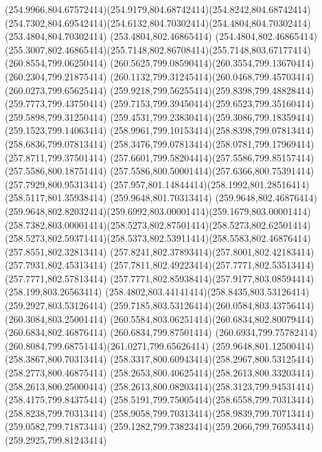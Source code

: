 {{	\curveto(254.9966,804.67572414)(254.9179,804.68742414)(254.8242,804.68742414)
	\curveto(254.7302,804.69542414)(254.6132,804.70302414)(254.4804,804.70302414)
	\lineto(253.4804,804.70302414)
	\lineto(253.4804,802.46865414)
	\lineto(254.4804,802.46865414)
	\curveto(255.3007,802.46865414)(255.7148,802.86708414)(255.7148,803.67177414)
	\closepath
	\moveto(260.8554,799.06250414)
	\curveto(260.5625,799.08590414)(260.3554,799.13670414)(260.2304,799.21875414)
	\curveto(260.1132,799.31245414)(260.0468,799.45703414)(260.0273,799.65625414)
	\curveto(259.9218,799.56255414)(259.8398,799.48828414)(259.7773,799.43750414)
	\curveto(259.7153,799.39450414)(259.6523,799.35160414)(259.5898,799.31250414)
	\curveto(259.4531,799.23830414)(259.3086,799.18359414)(259.1523,799.14063414)
	\curveto(258.9961,799.10153414)(258.8398,799.07813414)(258.6836,799.07813414)
	\curveto(258.3476,799.07813414)(258.0781,799.17969414)(257.8711,799.37501414)
	\curveto(257.6601,799.58204414)(257.5586,799.85157414)(257.5586,800.18751414)
	\curveto(257.5586,800.50001414)(257.6366,800.75391414)(257.7929,800.95313414)
	\curveto(257.957,801.14844414)(258.1992,801.28516414)(258.5117,801.35938414)
	\lineto(259.9648,801.70313414)
	\lineto(259.9648,802.46876414)
	\curveto(259.9648,802.82032414)(259.6992,803.00001414)(259.1679,803.00001414)
	\curveto(258.7382,803.00001414)(258.5273,802.87501414)(258.5273,802.62501414)
	\curveto(258.5273,802.59371414)(258.5373,802.53911414)(258.5583,802.46876414)
	\lineto(257.8551,802.32813414)
	\curveto(257.8241,802.37893414)(257.8001,802.42183414)(257.7931,802.45313414)
	\curveto(257.7811,802.49223414)(257.7771,802.53513414)(257.7771,802.57813414)
	\curveto(257.7771,802.85938414)(257.9177,803.08594414)(258.199,803.26563414)
	\curveto(258.4802,803.44141414)(258.8435,803.53126414)(259.2927,803.53126414)
	\curveto(259.7185,803.53126414)(260.0584,803.43756414)(260.3084,803.25001414)
	\curveto(260.5584,803.06251414)(260.6834,802.80079414)(260.6834,802.46876414)
	\lineto(260.6834,799.87501414)
	\curveto(260.6934,799.75782414)(260.8084,799.68751414)(261.0271,799.65626414)
	\closepath
	\moveto(259.9648,801.12500414)
	\lineto(258.3867,800.70313414)
	\curveto(258.3317,800.60943414)(258.2967,800.53125414)(258.2773,800.46875414)
	\curveto(258.2653,800.40625414)(258.2613,800.33203414)(258.2613,800.25000414)
	\curveto(258.2613,800.08203414)(258.3123,799.94531414)(258.4175,799.84375414)
	\curveto(258.5191,799.75005414)(258.6558,799.70313414)(258.8238,799.70313414)
	\curveto(258.9058,799.70313414)(258.9839,799.70713414)(259.0582,799.71873414)
	\curveto(259.1282,799.73823414)(259.2066,799.76953414)(259.2925,799.81243414)
}}
